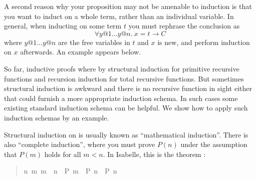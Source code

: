 \begin{isabelle}
\begin{isamarkuptext}
A second reason why your proposition may not be amenable to induction is that
you want to induct on a whole term, rather than an individual variable. In
general, when inducting on some term $t$ you must rephrase the conclusion as
\[ \forall y@1 \dots y@n.~ x = t \longrightarrow C \] where $y@1 \dots y@n$
are the free variables in $t$ and $x$ is new, and perform induction on $x$
afterwards. An example appears below.%
\end{isamarkuptext}%
%
%
\begin{isamarkuptext}%
So far, inductive proofs where by structural induction for
primitive recursive functions and recursion induction for total recursive
functions. But sometimes structural induction is awkward and there is no
recursive function in sight either that could furnish a more appropriate
induction schema. In such cases some existing standard induction schema can
be helpful. We show how to apply such induction schemas by an example.

Structural induction on  is
usually known as ``mathematical induction''. There is also ``complete
induction'', where you must prove $P(n)$ under the assumption that $P(m)$
holds for all $m<n$. In Isabelle, this is the theorem :
\begin{quote}

\begin{isabelle}%
{\isacharparenleft}{\isasymAnd}\mbox{n}{\isachardot}\ {\isasymforall}\mbox{m}{\isachardot}\ \mbox{m}\ {\isacharless}\ \mbox{n}\ {\isasymlongrightarrow}\ \mbox{{\isacharquery}P}\ \mbox{m}\ {\isasymLongrightarrow}\ \mbox{{\isacharquery}P}\ \mbox{n}{\isacharparenright}\ {\isasymLongrightarrow}\ \mbox{{\isacharquery}P}\ \mbox{{\isacharquery}n}
\end{isabelle}%


\end{quote}
\end{isamarkuptext}
\end{isabelle}
